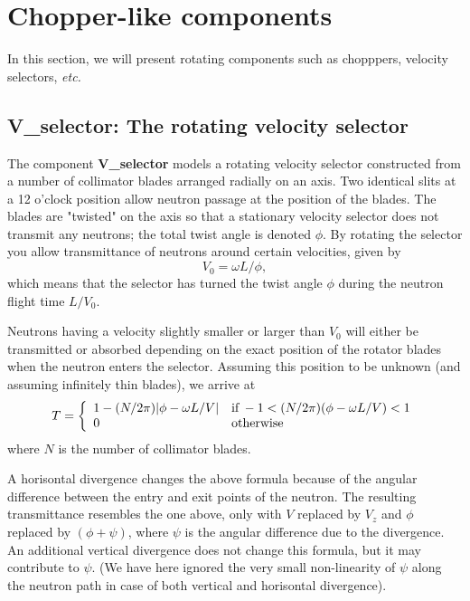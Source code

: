 
\chapter{Chopper-like components}

In this section, we will present rotating components such as 
chopppers, velocity selectors, {\em etc.}

\section{V\_selector: The rotating velocity selector}

The component {\bf V\_selector} models a rotating velocity
selector constructed from a number of collimator blades
arranged radially on an axis. Two identical slits 
at a 12 o'clock position allow
neutron passage at the position of the blades.
The blades are "twisted" on the axis so that a stationary 
velocity selector does not transmit any neutrons; the total
twist angle is denoted $\phi$.
By rotating the selector you allow 
transmittance of neutrons around certain velocities, given by
\begin{equation}
V_0 = \omega L / \phi ,
\end{equation}
which means that the selector has turned the twist angle
$\phi$ during the neutron flight time $L/V_0$.

Neutrons having a velocity slightly smaller or larger than $V_0$ 
will either be transmitted or absorbed depending on the exact position
of the rotator blades when the neutron enters the selector.
Assuming this position to be unknown (and assuming infinitely
thin blades), we arrive at
\begin{equation}
T = \left\{ 
 \begin{array}{ll}
 1 - (N/2\pi ) |\phi-\omega L / V| & 
        {\rm if}\,  -1 < (N/2\pi )(\phi -\omega L / V) < 1 \\
    0  &  {\rm otherwise}
 \end{array} \right.
\end{equation}
where $N$ is the number of collimator blades. 

A horisontal divergence changes the above formula because of the
angular difference between the entry and exit points of the neutron.
The resulting transmittance resembles the one above, only with 
$V$ replaced by $V_z$ and $\phi$ replaced by $(\phi +\psi )$, 
where $\psi$ is the angular difference due to
the divergence. An additional vertical divergence does not change 
this formula, but it may contribute to $\psi$.
(We have here ignored the very small non-linearity of $\psi$ along the
neutron path in case of both vertical and horisontal divergence).

